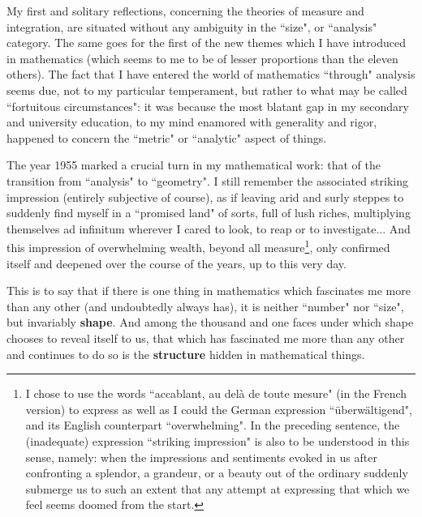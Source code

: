 My first and solitary reflections, concerning the theories of measure and integration, are situated without any ambiguity in the ``size", or ``analysis" category. The same goes for the first of the new themes which I have introduced in mathematics (which seems to me to be of lesser proportions than the eleven others). The fact that I have entered the world of mathematics ``through" analysis seems due, not to my particular temperament, but rather to what may be called ``fortuitous circumstances": it was because the most blatant gap in my secondary and university education, to my mind enamored with generality and rigor, happened to concern the ``metric" or ``analytic" aspect of things.

The year 1955 marked a crucial turn in my mathematical work: that of the transition from ``analysis" to ``geometry". I still remember the associated striking impression (entirely subjective of course), as if leaving arid and surly steppes to suddenly find myself in a ``promised land" of sorts, full of lush riches, multiplying themselves ad infinitum wherever I cared to look, to reap or to investigate... And this impression of overwhelming wealth, beyond all measure\footnote{I chose to use the words ``accablant, au del\`a de toute mesure" (in the French version) to express as well as I could the German expression ``\"uberw\"altigend", and its English counterpart ``overwhelming".  In the preceding sentence, the (inadequate) expression ``striking impression" is also to be understood in this sense, namely: when the impressions and sentiments evoked in us after confronting a splendor, a grandeur, or a beauty out of the ordinary suddenly submerge us to such an extent that any attempt at expressing that which we feel seems doomed from the start.}, only confirmed itself and deepened over the course of the years, up to this very day.

 This is to say that if there is one thing in mathematics which fascinates me more than any other (and undoubtedly always has), it is neither ``number" nor ``size", but invariably \textbf{shape}. And among the thousand and one faces under which shape chooses to reveal itself to us, that which has fascinated me more than any other and continues to do so is the \textbf{structure} hidden in mathematical things.

